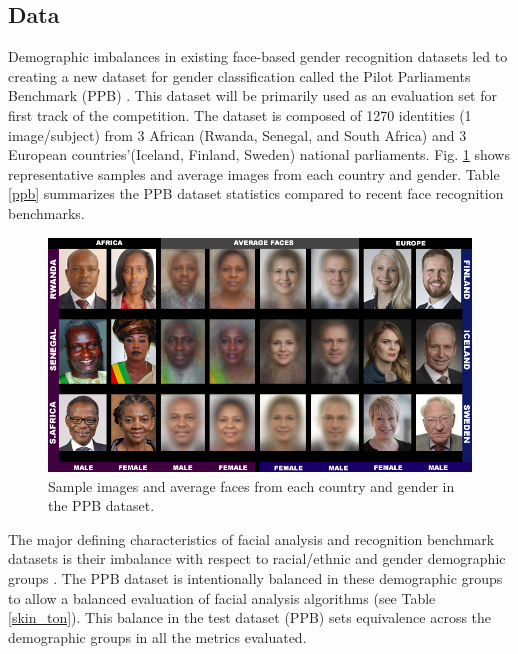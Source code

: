 \documentclass[11pt, oneside]{article}
\makeatletter
\let\@internalcite\cite
\def\cite{\def\citeauthoryear##1##2{##1, ##2}\@internalcite}
\makeatother
\begin{document}
\subsection{Data}

Demographic imbalances in existing face-based gender recognition datasets led to creating a new dataset for gender classification called the Pilot Parliaments Benchmark (PPB) \cite{buolamwini2018gender}. This dataset will be primarily used as an evaluation set for first track of the competition. The dataset is composed of 1270 identities (1 image/subject) from 3 African (Rwanda, Senegal, and South Africa) and 3 European countries'(Iceland, Finland, Sweden) national parliaments. Fig. \ref{fig_ppb} shows representative samples and average images from each country and gender. Table \ref{ppb} summarizes the PPB dataset statistics compared to recent face recognition benchmarks.

\begin{figure}[t]
    \label{fig_ppb}
    \centering
    \includegraphics[width=140mm]{fig/ppb}
    \caption{Sample images and average faces from each country and gender in the PPB dataset.}
\end{figure}



The major defining characteristics of facial analysis and recognition benchmark datasets is their imbalance with respect to racial/ethnic and gender demographic groups \cite{phillips2011other, han2015demographic}. The PPB dataset is intentionally balanced in these demographic groups to allow a balanced evaluation of facial analysis algorithms (see Table \ref{skin_ton}). This balance in the test dataset (PPB) sets equivalence across the demographic groups in all the metrics evaluated. 
\end{document}
